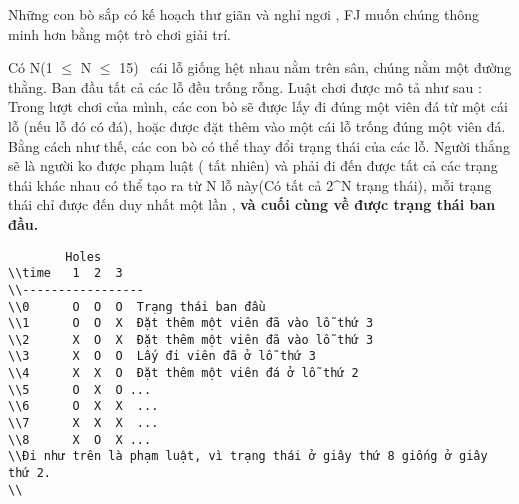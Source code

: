 Những con bò sắp có kế hoạch thư giãn và nghỉ ngơi , FJ muốn chúng thông minh hơn bằng một trò chơi giải trí.  

   Có N(1 $\le$ N $\le$ 15)  cái lỗ giống hệt nhau nằm trên sân, chúng nằm một đường thằng. Ban đầu tất cả các lỗ đều trống rỗng. Luật chơi được mô tả như sau : Trong lượt chơi của mình, các con bò sẽ được lấy đi đúng một viên đá từ một cái lỗ (nếu lỗ đó có đá), hoặc được đặt thêm vào một cái lỗ trống đúng một viên đá. Bằng cách như thế, các con bò có thể thay đổi trạng thái của các lỗ. Người thắng sẽ là người ko được phạm luật ( tất nhiên) và phải đi đến được tất cả các trạng thái khác nhau có thể tạo ra từ N lỗ này(Có tất cả 2^N trạng thái), mỗi trạng thái chỉ được đến duy nhất một lần ,   \textbf{    và cuối cùng về được trạng thái ban đầu.   }
\begin{verbatim}
        Holes
\\time   1  2  3 
\\-----------------
\\0      O  O  O  Trạng thái ban đầu
\\1      O  O  X  Đặt thêm một viên đã vào lỗ thứ 3
\\2      X  O  X  Đặt thêm một viên đã vào lỗ thứ 3
\\3      X  O  O  Lấy đi viên đã ở lỗ thứ 3
\\4      X  X  O  Đặt thêm một viên đá ở lỗ thứ 2
\\5      O  X  O ...
\\6      O  X  X  ...
\\7      X  X  X  ...
\\8      X  O  X ...
\\Đi như trên là phạm luật, vì trạng thái ở giây thứ 8 giống ở giây thứ 2.
\\\end{verbatim}

\